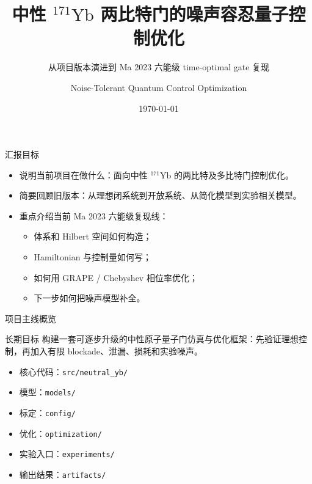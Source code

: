 \documentclass[aspectratio=169,11pt]{ctexbeamer}
\title[Ma 2023 六能级复现]{中性 \texorpdfstring{$^{171}\mathrm{Yb}$}{171Yb} 两比特门的噪声容忍量子控制优化}
\subtitle{从项目版本演进到 Ma 2023 六能级 time-optimal gate 复现}
\author{Noise-Tolerant Quantum Control Optimization}
\date{\today}
\begin{document}
\begin{frame}
  \titlepage
\end{frame}

\begin{frame}{汇报目标}
  \begin{itemize}
    \item 说明当前项目在做什么：面向中性 \({}^{171}\mathrm{Yb}\) 的两比特及多比特门控制优化。
    \item 简要回顾旧版本：从理想闭系统到开放系统、从简化模型到实验相关模型。
    \item 重点介绍当前 Ma 2023 六能级复现线：
      \begin{itemize}
        \item 体系和 Hilbert 空间如何构造；
        \item Hamiltonian 与控制量如何写；
        \item 如何用 GRAPE / Chebyshev 相位率优化；
        \item 下一步如何把噪声模型补全。
      \end{itemize}
  \end{itemize}
\end{frame}

\begin{frame}{项目主线概览}
  \begin{block}{长期目标}
    构建一套可逐步升级的中性原子量子门仿真与优化框架：先验证理想控制，再加入有限 blockade、泄漏、损耗和实验噪声。
  \end{block}

  \begin{itemize}
    \item 核心代码：\texttt{src/neutral\_yb/}
    \item 模型：\texttt{models/}
    \item 标定：\texttt{config/}
    \item 优化：\texttt{optimization/}
    \item 实验入口：\texttt{experiments/}
    \item 输出结果：\texttt{artifacts/}
  \end{itemize}
\end{frame}
\end{document}

